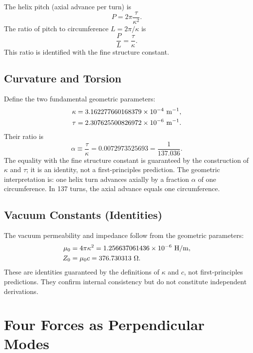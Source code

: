 \documentclass[aps,prd,10pt]{revtex4-2}
\begin{document}
The helix pitch (axial advance per turn) is
\begin{equation}
P = 2\pi\frac{\tau}{\kappa^2}.
\end{equation}
The ratio of pitch to circumference $L = 2\pi/\kappa$ is
\begin{equation}
\frac{P}{L} = \frac{\tau}{\kappa}.
\end{equation}
This ratio is identified with the fine structure constant.

\subsection{Curvature and Torsion}

Define the two fundamental geometric parameters:
\begin{align}
\kappa &= 3.162277660168379 \times 10^{-4}\ {\rm m}^{-1}, \\
\tau   &= 2.307625500826972 \times 10^{-6}\ {\rm m}^{-1}.
\end{align}
Their ratio is
\begin{equation}
\alpha \equiv \frac{\tau}{\kappa} = 0.0072973525693 = \frac{1}{137.036}.
\end{equation}
The equality with the fine structure constant is guaranteed by the
construction of $\kappa$ and $\tau$; it is an identity, not a first-principles
prediction. The geometric interpretation is: one helix turn advances axially
by a fraction $\alpha$ of one circumference. In 137 turns,
the axial advance equals one circumference.

\subsection{Vacuum Constants (Identities)}

The vacuum permeability and impedance follow from the geometric parameters:
\begin{align}
\mu_0 &= 4\pi\kappa^2 = 1.256637061436 \times 10^{-6}\ {\rm H/m}, \\
Z_0   &= \mu_0 c = 376.730313\ \Omega.
\end{align}
These are identities guaranteed by the definitions of $\kappa$ and $c$, not
first-principles predictions. They confirm internal consistency but do not
constitute independent derivations.

\section{Four Forces as Perpendicular Modes}
\end{document}
